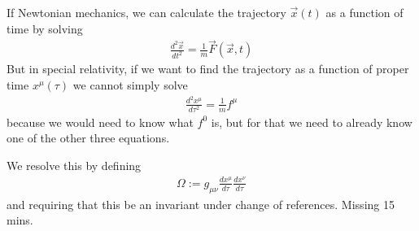 If Newtonian mechanics, we can calculate the trajectory $\vec{x}(t)$ as a function of time by solving
\begin{align*}
  \frac{d^{2} \vec{x}}{d t^{2}} = \frac{1}{m} \vec{F}(\vec{x},t)
\end{align*}
But in special relativity, if we want to find the trajectory as a function of proper time $x^{\mu}(\tau)$ we cannot simply solve
\begin{align*}
  \frac{d^{2} x^{\mu}}{d \tau^{2}} = \frac{1}{m} f^{\mu}
\end{align*}
because we would need to know what $f^{0}$ is, but for that we need to already know one of the other three equations.

We resolve this by defining
\begin{align*}
  \Omega := g_{\mu\nu} \frac{d x^{\mu}}{d \tau} \frac{d x^{\nu}}{d \tau}
\end{align*}
and requiring that this be an invariant under change of references.
Missing 15 mins.
